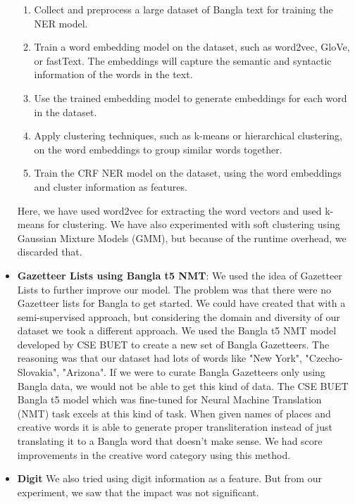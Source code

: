 \documentclass{article}
\begin{document}
\begin{itemize}
\begin{enumerate}
    \item Collect and preprocess a large dataset of Bangla text for training the NER model.
    \item Train a word embedding model on the dataset, such as word2vec, GloVe, or fastText. The embeddings will capture the semantic and syntactic information of the words in the text.
    \item Use the trained embedding model to generate embeddings for each word in the dataset.
    \item Apply clustering techniques, such as k-means or hierarchical clustering, on the word embeddings to group similar words together.
    \item Train the CRF NER model on the dataset, using the word embeddings and cluster information as features.
\end{enumerate}

Here, we have used word2vec for extracting the word vectors and used k-means for clustering. We have also experimented with soft clustering using Gaussian Mixture Models (GMM), but because of the runtime overhead, we discarded that.

\item \textbf{Gazetteer Lists using Bangla t5 NMT}: We used the idea of Gazetteer Lists to further improve our model. The problem was that there were no Gazetteer lists for Bangla to get started. We could have created that with a semi-supervised approach, but considering the domain and diversity of our dataset we took a different approach. 
We used the Bangla t5 NMT model \cite{hasan-etal-2020-low} developed by CSE BUET to create a new set of Bangla Gazetteers. The reasoning was that our dataset had lots of words like "New York", "Czecho-Slovakia", "Arizona". If we were to curate Bangla Gazetteers only using Bangla data, we would not be able to get this kind of data. The CSE BUET Bangla t5 model which was fine-tuned for Neural Machine Translation (NMT) task excels at this kind of task. When given names of places and creative words it is able to generate proper transliteration instead of just translating it to a Bangla word that doesn't make sense. We had score improvements in the creative word category using this method.

\item \textbf{Digit} We also tried using digit information as a feature. But from our experiment, we saw that the impact was not significant.

\end{itemize}
\end{document}
